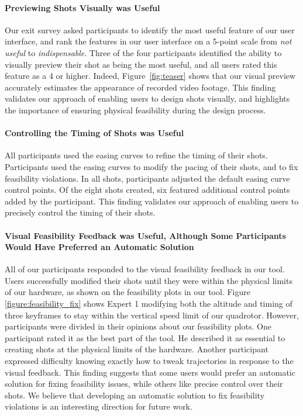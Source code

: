 \paragraph{Previewing Shots Visually was Useful}
Our exit survey asked participants to identify the most useful feature of our user interface, and rank the features in our user interface on a 5-point scale from \emph{not useful} to \emph{indispensable}.
Three of the four participants identified the ability to visually preview their shot as being the most useful, and all users rated this feature as a 4 or higher.
Indeed, Figure~\ref{fig:teaser} shows that our visual preview accurately estimates the appearance of recorded video footage.
This finding validates our approach of enabling users to design shots visually, and highlights the importance of ensuring physical feasibility during the design process.

\paragraph{Controlling the Timing of Shots was Useful}
All participants used the easing curves to refine the timing of their shots.
Participants used the easing curves to modify the pacing of their shots, and to fix feasibility violations.
In all shots, participants adjusted the default easing curve control points.
Of the eight shots created, six featured additional control points added by the participant.
This finding validates our approach of enabling users to precisely control the timing of their shots.

\paragraph{Visual Feasibility Feedback was Useful, Although Some Participants Would Have Preferred an Automatic Solution}
All of our participants responded to the visual feasibility feedback in our tool.
Users successfully modified their shots until they were within the physical limits of our hardware, as shown on the feasibility plots in our tool.
Figure \ref{figure:feasibility_fix} shows Expert 1 modifying both the altitude and timing of three keyframes to stay within the vertical speed limit of our quadrotor.
However, participants were divided in their opinions about our feasibility plots.
One participant rated it as the best part of the tool.
He described it as essential to creating shots at the physical limits of the hardware.
Another participant expressed difficulty knowing exactly how to tweak trajectories in response to the visual feedback.
This finding suggests that some users would prefer an automatic solution for fixing feasibility issues, while others like precise control over their shots.
We believe that developing an automatic solution to fix feasibility violations is an interesting direction for future work.

